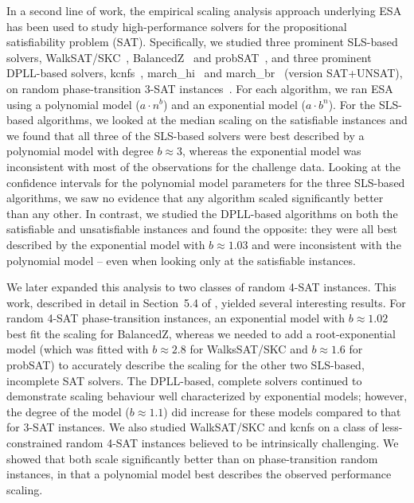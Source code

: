 \documentclass[aic]{iosart2x}
\begin{document}
In a second line of work, the empirical scaling analysis approach underlying ESA has been used to study high-performance solvers for the propositional satisfiability problem (SAT).
Specifically, we studied three prominent SLS-based solvers, WalkSAT/SKC~\cite{selman1994noise}, BalancedZ~\cite{li2014balance} and probSAT~\cite{balint2014probsat}, and three prominent DPLL-based solvers, kcnfs~\cite{dequen2004kcnfs}, march\_hi~\cite{heule2009march} and march\_br~\cite{heule2013march} (version SAT+UNSAT), on random phase-transition 3-SAT instances~\cite{MuHoo15}. For each algorithm, we ran ESA using a polynomial model ($a\cdot n^b$) and an exponential model ($a\cdot b^n$). For the SLS-based algorithms, we looked at the median scaling on the satisfiable instances and we found that all three of the SLS-based solvers were best described by a polynomial model with degree $b \approx 3$, whereas the exponential model was inconsistent with most of the observations for the challenge data. Looking at the confidence intervals for the polynomial model parameters for the three SLS-based algorithms, we saw no evidence that any algorithm scaled significantly better than any other. In contrast, we studied the DPLL-based algorithms on both the satisfiable and unsatisfiable instances and found the opposite: they were all best described by the exponential model with $b \approx 1.03$ and were inconsistent with the polynomial model -- even when looking only at the satisfiable instances. 

We later expanded this analysis to two classes of random 4-SAT instances. This work, described in detail in Section~5.4 of \cite{Mu15}, yielded several interesting results. For random 4-SAT phase-transition instances, an exponential model with $b \approx  1.02$ best fit the scaling for BalancedZ, whereas we needed to add a root-exponential model (which was fitted with $b \approx 2.8$ for WalksSAT/SKC and $b \approx  1.6$ for probSAT) to accurately describe the scaling for the other two SLS-based, incomplete SAT solvers. The DPLL-based, complete solvers continued to demonstrate scaling behaviour well characterized by exponential models; however, the degree of the model ($b \approx 1.1$) did increase for these models compared to that for 3-SAT instances. We also studied WalkSAT/SKC and kcnfs on a class of less-constrained random 4-SAT instances believed to be intrinsically challenging. We showed that both scale significantly better than on phase-transition random instances, in that a polynomial model best describes the observed performance scaling.
\end{document}
